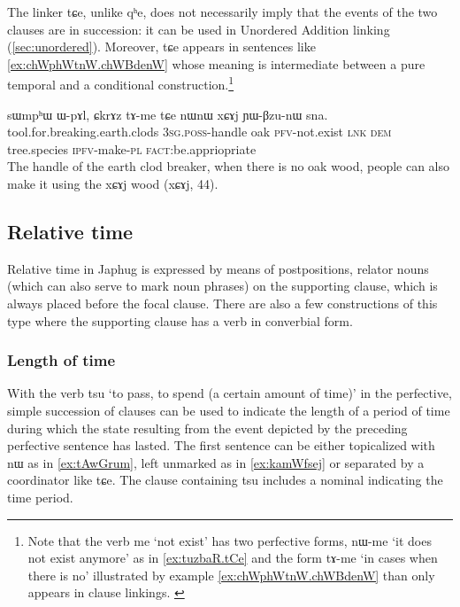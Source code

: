 \documentclass[oldfontcommands,oneside,a4paper,11pt]{article}
\newcommand{\ipa}[1]{{\phon \mbox{#1}}} %
\begin{document}
 The linker \ipa{tɕe}, unlike \ipa{qʰe},  does not necessarily imply that the events of the two clauses are in succession: it can be used in Unordered Addition linking (\ref{sec:unordered}). Moreover,  \ipa{tɕe}  appears in sentences like \ref{ex:chWphWtnW.chWBdenW} whose meaning is intermediate between a pure temporal and a conditional construction.\footnote{Note that the verb \ipa{me} `not exist' has two perfective forms,  \ipa{nɯ-me} `it does not exist anymore' as in \ref{ex:tuzbaR.tCe} and the   form \ipa{tɤ-me} `in cases when there is no' illustrated by example \ref{ex:chWphWtnW.chWBdenW} than only appears in clause linkings. \label{ft:tAme}}

\begin{exe}
\ex \label{ex:chWphWtnW.chWBdenW}
\gll 
   	\ipa{sɯmpʰɯ}  	\ipa{ɯ-pɤl,}  	\ipa{ɕkrɤz}  	\ipa{tɤ-me}  	\ipa{tɕe}  	\ipa{nɯnɯ}  	\ipa{xɕɤj}  	\ipa{ɲɯ-βzu-nɯ}  	\ipa{sna.}  \\
   	tool.for.breaking.earth.clods \textsc{3sg.poss}-handle oak \textsc{pfv}-not.exist \textsc{lnk} \textsc{dem} tree.species \textsc{ipfv}-make-\textsc{pl} \textsc{fact}:be.appriopriate \\
\glt The handle of the earth clod breaker, when there is no oak wood, people can also make it using the xɕɤj wood (xɕɤj, 44).
\end{exe}
 
  
\subsection{Relative time} \label{sec:relative.time}
Relative time in Japhug is expressed by means of postpositions, relator nouns (which can also serve to mark noun phrases) on the supporting clause, which is always placed before the focal clause. There are also a few constructions of this type where the supporting clause has a verb in converbial form. 





 \subsubsection{Length of time}
With the verb \ipa{tsu} `to pass, to spend (a certain amount of time)' in the perfective, simple succession of clauses can be used to indicate the length of a period of time during which the state resulting from the event depicted by the preceding perfective sentence has lasted.  The first sentence can be either topicalized with \ipa{nɯ} as in \ref{ex:tAwGrum}, left unmarked as in \ref{ex:kamWfsej} or separated by a coordinator like \ipa{tɕe}. The clause containing \ipa{tsu} includes a nominal indicating the time period.
\end{document}
